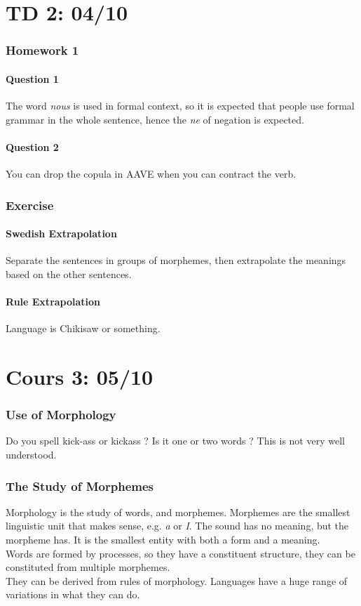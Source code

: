 \documentclass{cours}
\begin{document}
\part{TD 2: 04/10}
\section{Homework 1}
\subsection{Question 1}
The word \textsl{nous} is used in formal context, so it is expected that people use formal grammar in the whole sentence, hence the \textsl{ne} of negation is expected. 

\subsection{Question 2}
You can drop the copula in AAVE when you can contract the verb. 

\section{Exercise}
\subsection{Swedish Extrapolation}
Separate the sentences in groups of morphemes, then extrapolate the meanings based on the other sentences.

\subsection{Rule Extrapolation}
Language is Chikisaw or something.

\part[Morphology : The Structure of Words]{Cours 3: 05/10}
\section{Use of Morphology}
Do you spell kick-ass or kickass ? Is it one or two words ? This is not very well understood.

\section{The Study of Morphemes}
Morphology is the study of words, and morphemes. Morphemes are the smallest linguistic unit that makes sense, e.g. \textsl{a} or \textsl{I}. 
The sound has no meaning, but the morpheme has. It is the smallest entity with both a form and a meaning.\\
Words are formed by processes, so they have a constituent structure, they can be constituted from multiple morphemes.\\
They can be derived from rules of morphology. Languages have a huge range of variations in what they can do.\\
\end{document}
